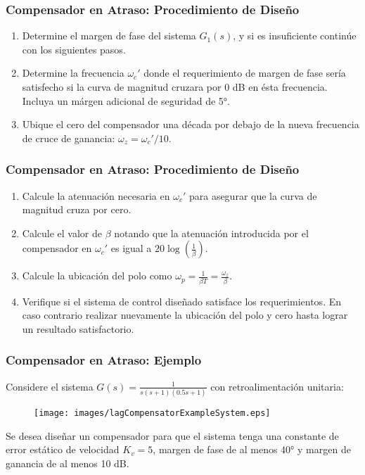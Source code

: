 \documentclass[aspectratio=169,handout]{beamer}
\theoremstyle{definition}
\theoremstyle{plain}
\theoremstyle{remark}
\newcounter{saveenumi}
\newcommand{\seti}{\setcounter{saveenumi}{\value{enumi}}}
\newcommand{\conti}{\setcounter{enumi}{\value{saveenumi}}}
\begin{document}
\begin{frame}[<+->]\frametitle{Compensador en Atraso: Procedimiento de Diseño}
	\begin{enumerate}
		\conti
		\item Determine el margen de fase del sistema $G_1(s)$, y si es insuficiente continúe con los siguientes pasos.
		\item Determine la frecuencia $\omega_c'$ donde el requerimiento de margen de fase sería satisfecho si la curva de magnitud cruzara por 0 dB en ésta frecuencia. Incluya un márgen adicional de seguridad de \ang{5}.
		\item Ubique el cero del compensador una década por debajo de la nueva frecuencia de cruce de ganancia: $\omega_z = \omega_c'/10$.
		\seti
	\end{enumerate}
\end{frame}

\begin{frame}[<+->]\frametitle{Compensador en Atraso: Procedimiento de Diseño}
	\begin{enumerate}
		\conti
		\item Calcule la atenuación necesaria en $\omega_c'$ para asegurar que la curva de magnitud cruza por cero.
		\item Calcule el valor de $\beta$ notando que la atenuación introducida por el compensador en $\omega_c'$ es igual a $20 \log \left(\frac{1}{\beta} \right)$.
		\item Calcule la ubicación del polo como $\omega_p = \frac{1}{\beta T} = \frac{\omega_z}{\beta}$.
		\item Verifique si el sistema de control diseñado satisface los requerimientos. En caso contrario realizar nuevamente la ubicación del polo y cero hasta lograr un resultado satisfactorio.
		\seti
	\end{enumerate}
\end{frame}

\begin{frame}[<+->]\frametitle{Compensador en Atraso: Ejemplo}
	Considere el sistema $G(s) = \frac{1}{s(s+1)(0.5s+1)}$ con retroalimentación unitaria:
	\begin{figure}
		\centering
		\texttt{[image: images/lagCompensatorExampleSystem.eps]}
	\end{figure}
	Se desea diseñar un compensador para que el sistema tenga una constante de error estático de velocidad $K_v = 5$, margen de fase de al menos \ang{40} y margen de ganancia de al menos 10 dB.
\end{frame}
\end{document}
